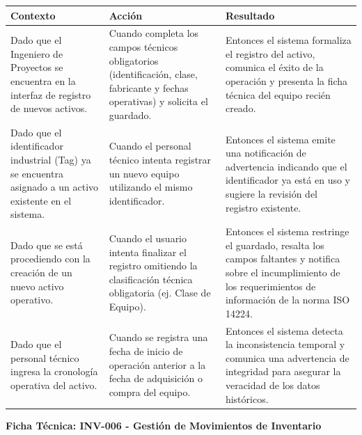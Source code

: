 \footnotesize\begin{longtable}{|p{0.28\textwidth}|p{0.32\textwidth}|p{0.34\textwidth}|}\hline
\textbf{Contexto} & \textbf{Acción} & \textbf{Resultado} \\ \hline
\parbox[t]{\linewidth}{Dado que el Ingeniero de Proyectos se encuentra en la interfaz de registro de nuevos activos.} & \parbox[t]{\linewidth}{Cuando completa los campos técnicos obligatorios (identificación, clase, fabricante y fechas operativas) y solicita el guardado.} & \parbox[t]{\linewidth}{Entonces el sistema formaliza el registro del activo, comunica el éxito de la operación y presenta la ficha técnica del equipo recién creado.} \\ \hline
\parbox[t]{\linewidth}{Dado que el identificador industrial (Tag) ya se encuentra asignado a un activo existente en el sistema.} & \parbox[t]{\linewidth}{Cuando el personal técnico intenta registrar un nuevo equipo utilizando el mismo identificador.} & \parbox[t]{\linewidth}{Entonces el sistema emite una notificación de advertencia indicando que el identificador ya está en uso y sugiere la revisión del registro existente.} \\ \hline
\parbox[t]{\linewidth}{Dado que se está procediendo con la creación de un nuevo activo operativo.} & \parbox[t]{\linewidth}{Cuando el usuario intenta finalizar el registro omitiendo la clasificación técnica obligatoria (ej. Clase de Equipo).} & \parbox[t]{\linewidth}{Entonces el sistema restringe el guardado, resalta los campos faltantes y notifica sobre el incumplimiento de los requerimientos de información de la norma ISO 14224.} \\ \hline
\parbox[t]{\linewidth}{Dado que el personal técnico ingresa la cronología operativa del activo.} & \parbox[t]{\linewidth}{Cuando se registra una fecha de inicio de operación anterior a la fecha de adquisición o compra del equipo.} & \parbox[t]{\linewidth}{Entonces el sistema detecta la inconsistencia temporal y comunica una advertencia de integridad para asegurar la veracidad de los datos históricos.} \\ \hline
\end{longtable}\normalsize
\vspace{1em}
\noindent\textbf{Ficha Técnica: INV-006 - Gestión de Movimientos de Inventario}
\footnotesize\setlength{\tabcolsep}{4pt}\renewcommand{\arraystretch}{1.2}
